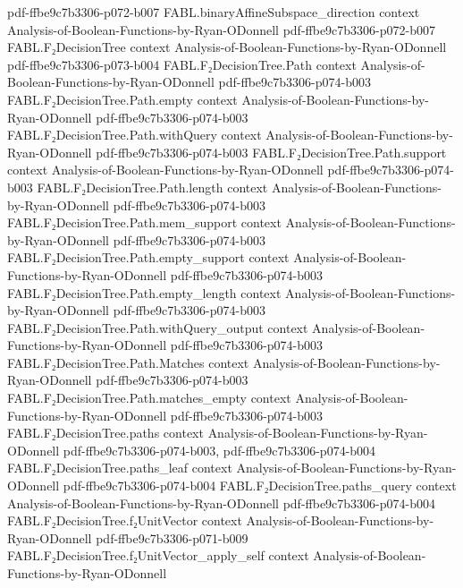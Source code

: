 \begin{theorem}
  {pdf-ffbe9c7b3306-p072-b007}
\proofstep
  {FABL.binaryAffineSubspace_direction}
  {context}
  {Analysis-of-Boolean-Functions-by-Ryan-ODonnell}
  {pdf-ffbe9c7b3306-p072-b007}
\proofstep
  {FABL.F₂DecisionTree}
  {context}
  {Analysis-of-Boolean-Functions-by-Ryan-ODonnell}
  {pdf-ffbe9c7b3306-p073-b004}
\proofstep
  {FABL.F₂DecisionTree.Path}
  {context}
  {Analysis-of-Boolean-Functions-by-Ryan-ODonnell}
  {pdf-ffbe9c7b3306-p074-b003}
\proofstep
  {FABL.F₂DecisionTree.Path.empty}
  {context}
  {Analysis-of-Boolean-Functions-by-Ryan-ODonnell}
  {pdf-ffbe9c7b3306-p074-b003}
\proofstep
  {FABL.F₂DecisionTree.Path.withQuery}
  {context}
  {Analysis-of-Boolean-Functions-by-Ryan-ODonnell}
  {pdf-ffbe9c7b3306-p074-b003}
\proofstep
  {FABL.F₂DecisionTree.Path.support}
  {context}
  {Analysis-of-Boolean-Functions-by-Ryan-ODonnell}
  {pdf-ffbe9c7b3306-p074-b003}
\proofstep
  {FABL.F₂DecisionTree.Path.length}
  {context}
  {Analysis-of-Boolean-Functions-by-Ryan-ODonnell}
  {pdf-ffbe9c7b3306-p074-b003}
\proofstep
  {FABL.F₂DecisionTree.Path.mem_support}
  {context}
  {Analysis-of-Boolean-Functions-by-Ryan-ODonnell}
  {pdf-ffbe9c7b3306-p074-b003}
\proofstep
  {FABL.F₂DecisionTree.Path.empty_support}
  {context}
  {Analysis-of-Boolean-Functions-by-Ryan-ODonnell}
  {pdf-ffbe9c7b3306-p074-b003}
\proofstep
  {FABL.F₂DecisionTree.Path.empty_length}
  {context}
  {Analysis-of-Boolean-Functions-by-Ryan-ODonnell}
  {pdf-ffbe9c7b3306-p074-b003}
\proofstep
  {FABL.F₂DecisionTree.Path.withQuery_output}
  {context}
  {Analysis-of-Boolean-Functions-by-Ryan-ODonnell}
  {pdf-ffbe9c7b3306-p074-b003}
\proofstep
  {FABL.F₂DecisionTree.Path.Matches}
  {context}
  {Analysis-of-Boolean-Functions-by-Ryan-ODonnell}
  {pdf-ffbe9c7b3306-p074-b003}
\proofstep
  {FABL.F₂DecisionTree.Path.matches_empty}
  {context}
  {Analysis-of-Boolean-Functions-by-Ryan-ODonnell}
  {pdf-ffbe9c7b3306-p074-b003}
\proofstep
  {FABL.F₂DecisionTree.paths}
  {context}
  {Analysis-of-Boolean-Functions-by-Ryan-ODonnell}
  {pdf-ffbe9c7b3306-p074-b003,
    pdf-ffbe9c7b3306-p074-b004}
\proofstep
  {FABL.F₂DecisionTree.paths_leaf}
  {context}
  {Analysis-of-Boolean-Functions-by-Ryan-ODonnell}
  {pdf-ffbe9c7b3306-p074-b004}
\proofstep
  {FABL.F₂DecisionTree.paths_query}
  {context}
  {Analysis-of-Boolean-Functions-by-Ryan-ODonnell}
  {pdf-ffbe9c7b3306-p074-b004}
\proofstep
  {FABL.F₂DecisionTree.f₂UnitVector}
  {context}
  {Analysis-of-Boolean-Functions-by-Ryan-ODonnell}
  {pdf-ffbe9c7b3306-p071-b009}
\proofstep
  {FABL.F₂DecisionTree.f₂UnitVector_apply_self}
  {context}
  {Analysis-of-Boolean-Functions-by-Ryan-ODonnell}

\end{theorem}
